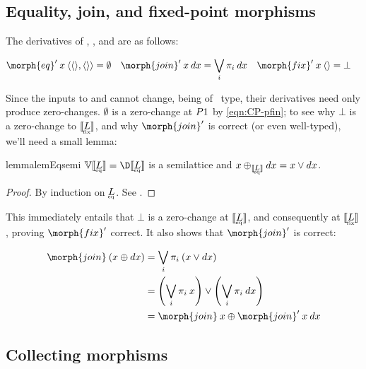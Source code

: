\documentclass{rntz}\usepackage{fantasy}%
\begin{document}


\subsection{Equality, join, and fixed-point morphisms}
\label{sec:CP-families}

The derivatives of , , and  are as follows:

\nopagebreak[2]
\begin{align*}
  \deriv{\morph{eq}} \<x \<\tuple{\tuple{},\tuple{}} &= \emptyset &
  \deriv{\morph{join}} \<x \<\dx &= \bigvee_i \pi_i\<\dx &
  \deriv{\morph{fix}} \<x \<\tuple{} &= \bot
\end{align*}

\noindent
Since the inputs to  and  cannot change, being of
\iso\ type, their derivatives need only produce zero-changes. $\emptyset$ is a
zero-change at $P 1$ by \cref{eqn:CP-pfin}; to see why $\bot$ is a
zero-change to $\den{\fixt L}$, and why $\deriv{\morph{join}}$ is correct (or
even well-typed), we'll need a small lemma:

\nopagebreak[2]
\begin{restatable}{lemma}{lemEqsemi}
  \label{lem:eqsemi}
  \(\vals{\den{\eqt L}} = \chgs{\den{\eqt L}}\) is a semilattice and $x
  \upd_{\den{\eqt L}} \dx = x \vee \dx$.
\end{restatable}
\begin{proof}
  By induction on $\eqt L$. See .
\end{proof}

\noindent This immediately entails that $\bot$ is a zero-change at
$\den{\eqt{L}}$, and consequently at $\den{\fixt L}$, proving
$\deriv{\morph{fix}}$ correct. It also shows that $\deriv{\morph{join}}$ is
correct:

\nopagebreak[2]
\begin{align*}
  \morph{join}\<(x \upd \dx) &= \bigvee_i \pi_i \<(x \vee \dx)\\
  &= \left(\bigvee_i \pi_i\<x\right) \vee \left(\bigvee_i \pi_i\<\dx\right)\\
  &= \morph{join}\<x \upd \deriv{\morph{join}}\<x\<\dx
\end{align*}


\subsection{Collecting morphisms}
\label{sec:CP-collect}
\end{document}
